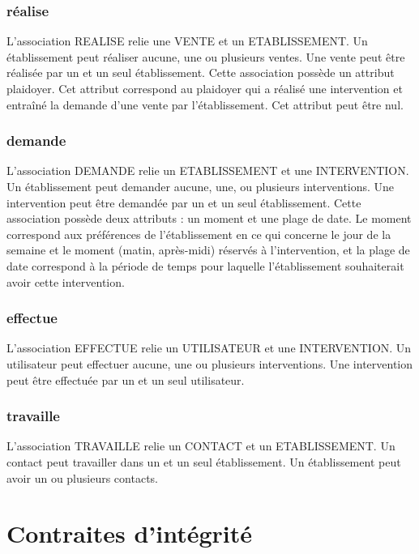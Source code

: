 \documentclass[asi, sansVersion]{picInsa}
\begin{document}
\subsection*{réalise}

L'association REALISE relie une VENTE et un ETABLISSEMENT. Un établissement peut réaliser aucune, une ou plusieurs ventes. Une vente peut être réalisée par un et un seul établissement. Cette association possède un attribut plaidoyer. Cet attribut correspond au plaidoyer qui a réalisé une intervention et entraîné la demande d'une vente par l'établissement. Cet attribut peut être nul.


\subsection*{demande}

L'association DEMANDE relie un ETABLISSEMENT et une INTERVENTION. Un établissement peut demander aucune, une, ou plusieurs interventions. Une intervention peut être demandée par un et un seul établissement. Cette association possède deux attributs : un moment et une plage de date. Le moment correspond aux préférences de l'établissement en ce qui concerne le jour de la semaine et le moment (matin, après-midi) réservés à l'intervention, et la plage de date correspond à la période de temps pour laquelle l'établissement souhaiterait avoir cette intervention. 


\subsection*{effectue} 

L'association EFFECTUE relie un UTILISATEUR et une INTERVENTION. Un utilisateur peut effectuer aucune, une ou plusieurs interventions. Une intervention peut être effectuée par un et un seul utilisateur. 

\subsection*{travaille}

L'association TRAVAILLE relie un CONTACT et un ETABLISSEMENT. Un contact peut travailler dans un et un seul établissement. Un établissement peut avoir un ou plusieurs contacts.   

\chapter{Contraites d'intégrité}
\end{document}
